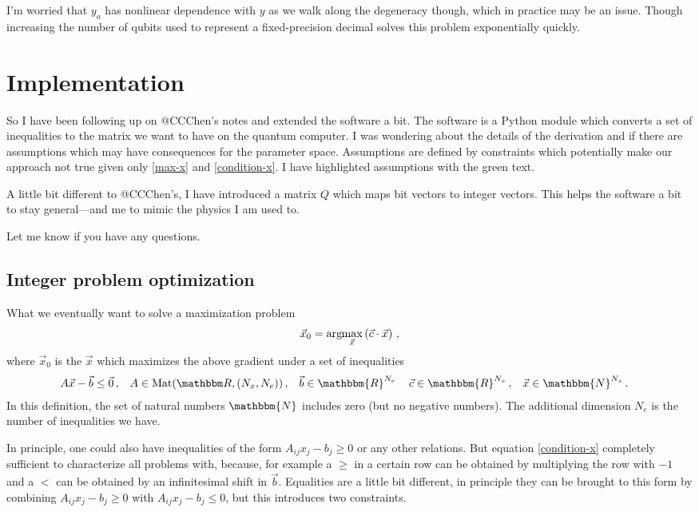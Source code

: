 \documentclass[]{article}
\newcommand{\argmax}[1]{\text{arg}\hspace{-2pt}\max\limits_{#1}}
\newcommand{\assumption}[1]{{\color{red}#1}}
\begin{document}
I'm worried that $y_a$ has nonlinear dependence with $y$ as we walk along the degeneracy though, which in practice may be an issue. Though increasing the number of qubits used to represent a fixed-precision decimal solves this problem exponentially quickly.

\section{Implementation}

So I have been following up on @CCChen's notes and extended the software a bit.
The software is a Python module which converts a set of inequalities to the matrix we want to have on the quantum computer.
I was wondering about the details of the derivation and if there are assumptions which may have consequences for the parameter space.
Assumptions are defined by constraints which potentially make our approach not true given only \eqref{max-x} and \eqref{condition-x}.
I have highlighted assumptions with the \assumption{green text}.

A little bit different to @CCChen's, I have introduced a matrix $Q$ which maps bit vectors to integer vectors.
This helps the software a bit to stay general---and me to mimic the physics I am used to.

Let me know if you have any questions.

\subsection{Integer problem optimization}
What we eventually want to solve a maximization problem
\begin{equation}\label{max-x}
	\vec x_0 = \argmax{\vec x} \left( \vec c \cdot \vec x\right) \, ,
\end{equation}
where $\vec x_0$ is the $\vec x$ which maximizes the above gradient under a set of inequalities
\begin{align}\label{condition-x}
	A \vec x - \vec b &\leq \vec 0 \, , &
	A &\in \text{Mat}(\mathbbm R, (N_x, N_e)) \, , &
	\vec b &\in \mathbbm{R}^{N_e} \, &
	\vec c &\in \mathbbm{R}^{N_x} \, , &
	\vec x &\in \mathbbm{N}^{N_x}\, .
\end{align}
In this definition, the set of natural numbers $\mathbbm{N}$ includes zero (but no negative numbers).
The additional dimension $N_e$ is the number of inequalities we have.

In principle, one could also have inequalities of the form $A_{ij} x_j - b_j \geq 0$ or any other relations.
But equation \eqref{condition-x} completely sufficient to characterize all problems with, because, for example a $\geq$ in a certain row can be obtained by multiplying the row with $-1$ and a $<$ can be obtained by an infinitesimal shift in $\vec b$.
Equalities are a little bit different, in principle they can be brought to this form by combining $A_{ij} x_j - b_j \geq 0$ with $A_{ij} x_j - b_j \leq 0$, but this introduces two constraints.
\end{document}
